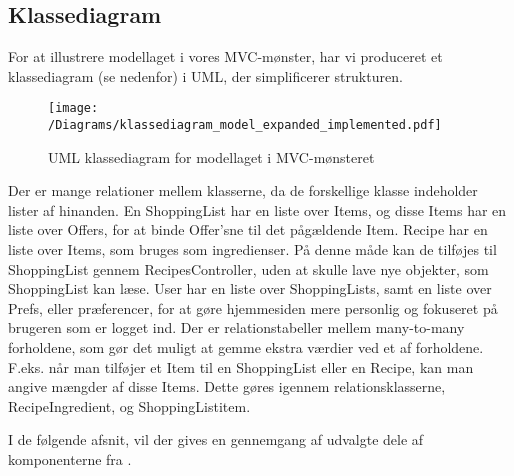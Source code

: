 \subsection{Klassediagram}
For at illustrere modellaget i vores MVC-mønster, har vi produceret et klassediagram (se  nedenfor) i UML, der simplificerer strukturen.

\begin{figure}[H]
\centering
\texttt{[image: /Diagrams/klassediagram\_model\_expanded\_implemented.pdf]}
\caption{UML klassediagram for modellaget i MVC-mønsteret}\label{diagram:klassediagram}
\end{figure}

Der er mange relationer mellem klasserne, da de forskellige klasse indeholder lister af hinanden.
En ShoppingList har en liste over Items, og disse Items har en liste over Offers, for at binde Offer'sne til det pågældende Item.
Recipe har en liste over Items, som bruges som ingredienser.
På denne måde kan de tilføjes til ShoppingList gennem RecipesController, uden at skulle lave nye objekter, som ShoppingList kan læse.
User har en liste over ShoppingLists, samt en liste over Prefs, eller præferencer, for at gøre hjemmesiden mere personlig og fokuseret på brugeren som er logget ind.
Der er relationstabeller mellem many-to-many forholdene, som gør det muligt at gemme ekstra værdier ved et af forholdene.
F.eks. når man tilføjer et Item til en ShoppingList eller en Recipe, kan man angive mængder af disse Items.
Dette gøres igennem relationsklasserne, Recipe\textunderscore Ingredient, og ShoppingList\textunderscore item.

I de følgende afsnit, vil der gives en gennemgang af udvalgte dele af komponenterne fra .
